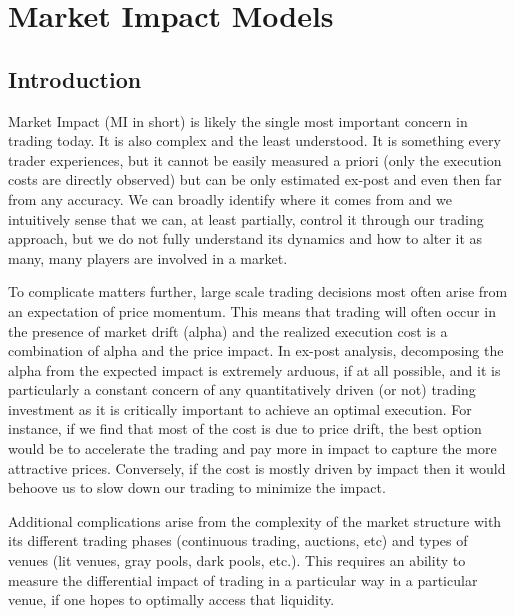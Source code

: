 \chapter{Market Impact Models\label{chap:ch_mi_models}} \label{in:impact1}
\section{Introduction\label{sec:mark_impact_intro}}

Market Impact (MI in short) is likely the single most important concern in trading today. It is also complex and the least understood. It is something every trader experiences, but it cannot be easily measured a priori (only the execution costs are directly observed) but can be only estimated ex-post and even then far from any accuracy. We can broadly identify where it comes from and we intuitively sense that we can, at least partially, control it through our trading approach, but we do not fully understand its dynamics and how to alter it as many, many players are involved in a market.


To complicate matters further, large scale trading decisions most often arise from an expectation of price momentum. This means that trading will often occur in the presence of market drift (alpha) and the realized execution cost is a combination of alpha and the price impact. In ex-post analysis, decomposing the alpha from the expected impact is extremely arduous, if at all possible, and it is particularly a constant concern of any quantitatively driven (or not) trading investment as it is critically important to achieve an optimal execution. For instance, if we find that most of the cost is due to price drift, the best option would be to accelerate the trading and pay more in impact to capture the more attractive prices. Conversely, if the cost is mostly driven by impact then it would behoove us to slow down our trading to minimize the impact.


Additional complications arise from the complexity of the market structure with its different trading phases (continuous trading, auctions, etc) and types of venues (lit venues, gray pools, dark pools, etc.). This requires an ability to measure the differential impact of trading in a particular way in a particular venue, if one hopes to optimally access that liquidity.


